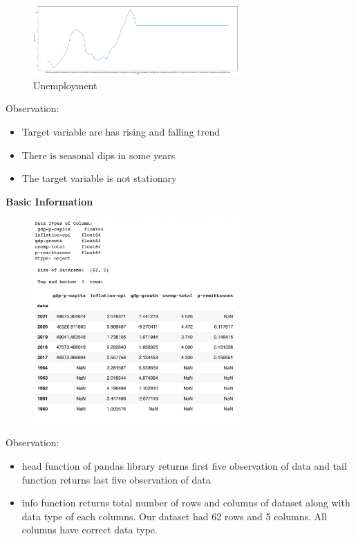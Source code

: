 \begin{figure}[H]
    \centering
    \includegraphics[width=0.7\textwidth]{Images/unemp-total vs year (1).pdf}
    \caption{Unemployment}
    \label{fig1}
\end{figure}

Observation:
\begin{itemize}
  \item Target variable are has rising and falling trend
  \item There is seasonal dips in some years
  \item The target variable is not stationary
\end{itemize}

\vspace{10mm}

\hspace{10mm}\textbf{Basic Information}\\
\begin{figure}[H]
    \centering
    \includegraphics[width=0.7\textwidth]{Images/BasicInfo.png}
\end{figure}

Observation:
\begin{itemize}
 \item head function of pandas library returns first five observation of data and tail function returns last five observation of data
\item info function returns total number of rows and columns of dataset along with data type of each columns. Our dataset had 62 rows and 5 columns. All columns have correct data type.
\end{itemize}

